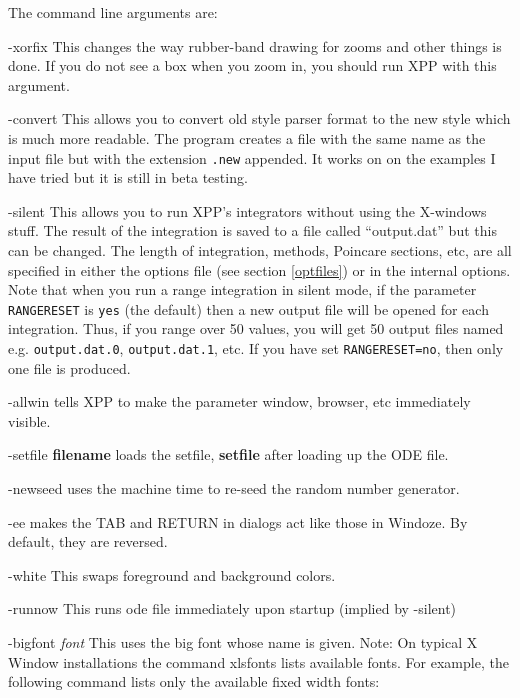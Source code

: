 The command line arguments are: 
\begin{description}
\item{-xorfix} This changes the way rubber-band drawing for zooms and
other things is done. If you do not see a box when you zoom in, you
should run XPP with this argument.
\item{-convert}  This allows you to convert old style parser format to
the new style which is much more readable. The program creates a file
with the same name as the input file but with the extension {\tt .new}
appended. It works on on the examples I have tried but it is still in
beta testing.
\item{-silent} This allows you to run XPP's integrators without using
the X-windows stuff.  The result of the integration is saved to a file
called ``output.dat'' but this can be changed. The length of
integration, methods, Poincare sections, etc, are all specified in
either the options file (see section \ref{optfiles})
 or in the internal options. Note that when you run a range integration
in silent mode, if the parameter {\tt RANGERESET} is {\tt yes} (the default) 
then a new output file will be opened for each integration. Thus, if you range 
over 50 values, you will get 50 output files named e.g. {\tt output.dat.0}, 
{\tt output.dat.1}, etc. If you have set {\tt RANGERESET=no}, then only
one file is produced.
\item{-allwin} tells XPP to make the parameter window, browser, etc
immediately visible.
\item{-setfile {\bf filename}} loads the setfile, {\bf setfile} after
loading up the  ODE file.
\item{-newseed} uses the machine time to re-seed the random number
generator. 
\item{-ee} makes the TAB and RETURN in dialogs act like those in
Windoze. By default, they are reversed.  
\item{-white} This swaps foreground and background colors. 
\item{-runnow} This runs ode file immediately upon startup (implied by -silent)
\item{-bigfont \emph{font}} This uses the big font whose name is given. Note:  On  typical  X  Window  installations the command xlsfonts lists
       available fonts.  For example, the following  command  lists  only  the
       available fixed width fonts:
\begin{center}\ttfamily\begin{minipage}{55ex}

\end{minipage}
\end{center}
\end{description}

